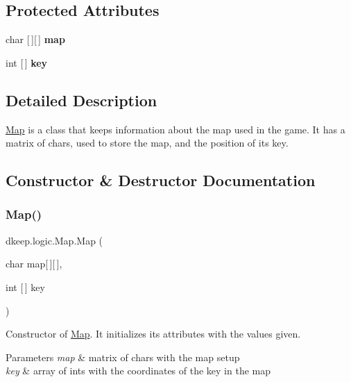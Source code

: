 \subsection*{Protected Attributes}
\begin{DoxyCompactItemize}
\item 
\mbox{\label{classdkeep_1_1logic_1_1_map_a1233e77a9f52ff73c1e233790caba7f8}} 
char \mbox{[}$\,$\mbox{]}\mbox{[}$\,$\mbox{]} {\bfseries map}
\item 
\mbox{\label{classdkeep_1_1logic_1_1_map_a38fbe49aa5250d71f3f0fb55c44ba973}} 
int \mbox{[}$\,$\mbox{]} {\bfseries key}
\end{DoxyCompactItemize}


\subsection{Detailed Description}
\hyperlink{classdkeep_1_1logic_1_1_map}{Map} is a class that keeps information about the map used in the game. It has a matrix of chars, used to store the map, and the position of it\textquotesingle{}s key. 

\subsection{Constructor \& Destructor Documentation}
\mbox{\label{classdkeep_1_1logic_1_1_map_a21bca3900428a3b8825b6da6214f2996}} 
\subsubsection{\texorpdfstring{Map()}{Map()}}
{\footnotesize\ttfamily dkeep.\+logic.\+Map.\+Map (\begin{DoxyParamCaption}\item[{char}]{map\mbox{[}$\,$\mbox{]}\mbox{[}$\,$\mbox{]},  }\item[{int \mbox{[}$\,$\mbox{]}}]{key }\end{DoxyParamCaption})}

Constructor of \hyperlink{classdkeep_1_1logic_1_1_map}{Map}. It initializes its attributes with the values given. 
\begin{DoxyParams}{Parameters}
{\em map} & matrix of chars with the map setup \\
\hline
{\em key} & array of ints with the coordinates of the key in the map \\
\hline
\end{DoxyParams}


